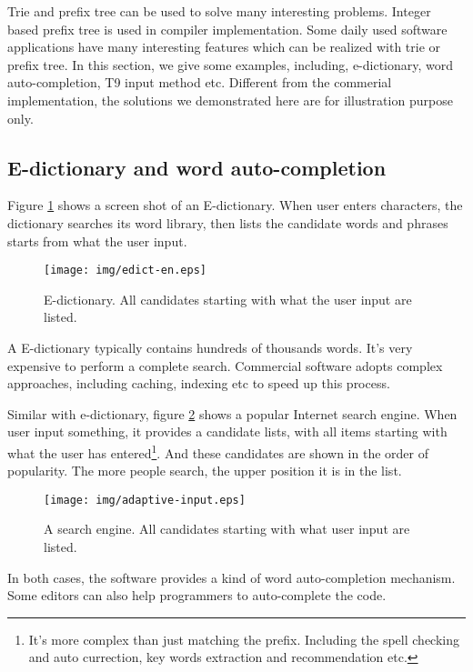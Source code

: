 \documentclass{article}
\begin{document}
Trie and prefix tree can be used to solve many interesting problems.
Integer based prefix tree is used in compiler implementation. Some daily
used software applications have many interesting features which can be
realized with trie or prefix tree. In this section, we give some examples,
including, e-dictionary, word auto-completion, T9
input method etc. Different from the commerial implementation, the
solutions we demonstrated here are for illustration purpose
only.

\subsection{E-dictionary and word auto-completion}
Figure \ref{fig:e-dict} shows a screen shot of an E-dictionary.
When user enters characters,
the dictionary searches its word library, then lists the candidate words and
phrases starts from what the user input.

\begin{figure}[htbp]
  \centering
  \texttt{[image: img/edict-en.eps]}
  \caption{E-dictionary. All candidates starting with what the user input are listed.}
  \label{fig:e-dict}
\end{figure}

A E-dictionary typically contains hundreds of thousands words. It's very expensive
to perform a complete search. Commercial software adopts complex approaches, including
caching, indexing etc to speed up this process.

Similar with e-dictionary, figure \ref{fig:word-completion} shows a popular
Internet search engine. When user input something, it provides a candidate
lists, with all items starting with what the user has entered\footnote{It's more complex than just matching the prefix. Including the spell checking and auto currection, key words extraction and recommendation etc.}. And these candidates
are shown in the order of popularity. The more people search, the
upper position it is in the list.

\begin{figure}[htbp]
  \centering
  \texttt{[image: img/adaptive-input.eps]}
  \caption{A search engine. All candidates starting with what user input are listed.}
  \label{fig:word-completion}
\end{figure}

In both cases, the software provides a kind of word auto-completion mechanism.
Some editors can also help programmers to auto-complete the code.
\end{document}
